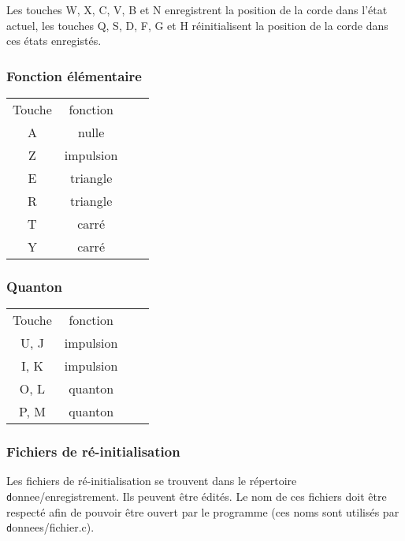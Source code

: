 Les touches {\sf W}, {\sf X}, {\sf C}, {\sf V}, {\sf B} et {\sf N} enregistrent la position de la corde dans l'état actuel, les touches {\sf Q}, {\sf S}, {\sf D}, {\sf F}, {\sf G} et {\sf H} réinitialisent la position de la corde dans ces états enregistés.
%
\subsubsection{Fonction élémentaire}
%
\begin{center}
\begin{tabular}{cc cc}%
Touche & fonction \\
A & nulle &\\
Z & impulsion &\\
E & triangle&\\
R & triangle&\\
T & carré &\\
Y & carré &\\
\end{tabular}
\end{center}
%
\subsubsection{Quanton}
%
\begin{center}
\begin{tabular}{cc cc}%
Touche & fonction \\
U, J & impulsion &\\
I, K & impulsion &\\
O, L & quanton &\\
P, M & quanton &\\
\end{tabular}
\end{center}

\subsubsection{Fichiers de ré-initialisation}
Les fichiers de ré-initialisation se trouvent dans le répertoire {\texttt donnee/enregistrement}. Ils peuvent être édités. Le nom de ces fichiers doit être respecté afin de pouvoir être ouvert par le programme (ces noms sont utilisés par {\texttt donnees/fichier.c}).
%
%
